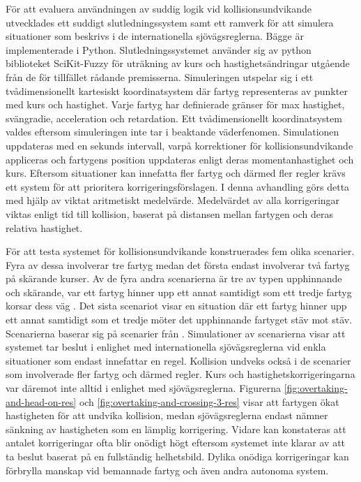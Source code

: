 För att evaluera användningen av suddig logik vid kollisionsundvikande utvecklades ett suddigt slutledningssystem samt ett ramverk för att simulera situationer som beskrivs i de  internationella sjövägsreglerna. Bägge är implementerade i Python. Slutledningssystemet använder sig av python biblioteket SciKit-Fuzzy \cite{josh_warner_2017_1002946} för uträkning av kurs och hastighetsändringar utgående från  de för tillfället rådande premisserna. Simuleringen utspelar sig i ett tvådimensionellt kartesiskt koordinatsystem där fartyg representeras av punkter med  kurs och hastighet. Varje fartyg har definierade gränser för max hastighet, svängradie, acceleration och retardation.  Ett tvådimensionellt koordinatsystem valdes eftersom simuleringen inte tar i beaktande väderfenomen. Simulationen uppdateras med en sekunds intervall, varpå  korrektioner för kollisionsundvikande appliceras och fartygens position uppdateras enligt deras momentanhastighet och kurs.   Eftersom situationer kan innefatta fler fartyg och därmed fler regler krävs ett system för att prioritera korrigeringsförslagen. I denna avhandling görs detta med hjälp av viktat aritmetiskt medelvärde. Medelvärdet av alla korrigeringar viktas enligt tid till kollision, baserat på  distansen mellan fartygen och deras relativa hastighet.



För att testa systemet för kollisionsundvikande konstruerades fem olika scenarier. Fyra av dessa involverar tre fartyg medan det första endast involverar två fartyg på skärande kurser.  Av de fyra andra scenarierna är tre av typen upphinnande och skärande, var ett fartyg hinner upp ett annat samtidigt som ett tredje fartyg korsar dess väg . Det sista scenariot visar en situation där ett fartyg hinner upp ett annat samtidigt som et tredje möter det upphinnande fartyget stäv mot stäv.  Scenarierna baserar sig på scenarier från \textcite{ecolreg_overtaking-and-crossing,ecolreg_overtaking-and-crossing-3,ecolreg_overtaking-and-crossing-2,ecolreg_overtaking-and-head-on}.  Simulationer av scenarierna visar att systemet tar beslut i  enlighet med   internationella sjövägsreglerna vid enkla situationer som endast innefattar en regel.  Kollision undveks också i de scenarier som involverade fler fartyg och därmed regler. Kurs och hastighetskorrigeringarna var däremot inte alltid i enlighet med sjövägsreglerna. Figurerna \ref{fig:overtaking-and-head-on-res} och \ref{fig:overtaking-and-crossing-3-res} visar att fartygen ökat hastigheten för att undvika kollision, medan sjövägsreglerna endast nämner sänkning av hastigheten som en lämplig korrigering. Vidare kan konstateras att antalet korrigeringar ofta blir onödigt högt  eftersom systemet inte klarar av att ta beslut baserat på en fullständig helhetsbild. Dylika onödiga korrigeringar kan förbrylla manskap vid bemannade fartyg och även andra autonoma system. 


